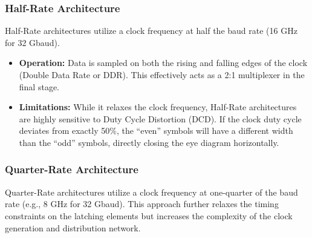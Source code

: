 \documentclass[12pt, a4paper]{report}
\begin{document}
\subsubsection{Half-Rate Architecture}
Half-Rate architectures utilize a clock frequency at half the baud rate (16 GHz for 32 Gbaud).
\begin{itemize}
    \item \textbf{Operation:} Data is sampled on both the rising and falling edges of the clock (Double Data Rate or DDR). This effectively acts as a 2:1 multiplexer in the final stage.
    \item \textbf{Limitations:} While it relaxes the clock frequency, Half-Rate architectures are highly sensitive to Duty Cycle Distortion (DCD). If the clock duty cycle deviates from exactly 50\%, the ``even'' symbols will have a different width than the ``odd'' symbols, directly closing the eye diagram horizontally.
\end{itemize}

\subsubsection{Quarter-Rate Architecture}

Quarter-Rate architectures utilize a clock frequency at one-quarter of the baud rate (e.g., 8 GHz for 32 Gbaud). This approach further relaxes the timing constraints on the latching elements but increases the complexity of the clock generation and distribution network.
\end{document}
